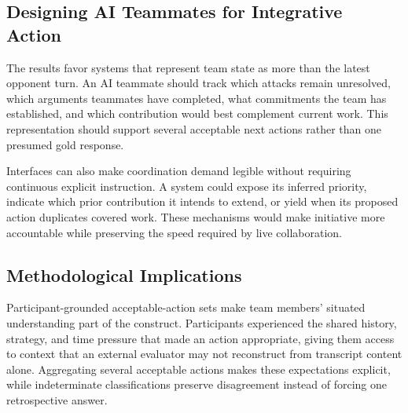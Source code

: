 \documentclass[manuscript,review,anonymous]{acmart}
\begin{document}
\subsection{Designing AI Teammates for Integrative Action}

The results favor systems that represent team state as more than the latest opponent turn. An AI teammate should track which attacks remain unresolved, which arguments teammates have completed, what commitments the team has established, and which contribution would best complement current work. This representation should support several acceptable next actions rather than one presumed gold response.

Interfaces can also make coordination demand legible without requiring continuous explicit instruction. A system could expose its inferred priority, indicate which prior contribution it intends to extend, or yield when its proposed action duplicates covered work. These mechanisms would make initiative more accountable while preserving the speed required by live collaboration.

\subsection{Methodological Implications}

Participant-grounded acceptable-action sets make team members' situated understanding part of the construct. Participants experienced the shared history, strategy, and time pressure that made an action appropriate, giving them access to context that an external evaluator may not reconstruct from transcript content alone. Aggregating several acceptable actions makes these expectations explicit, while indeterminate classifications preserve disagreement instead of forcing one retrospective answer.
\end{document}
